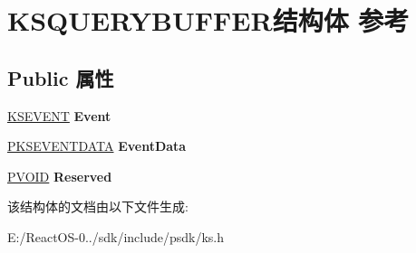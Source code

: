 \hypertarget{struct_k_s_q_u_e_r_y_b_u_f_f_e_r}{}\section{K\+S\+Q\+U\+E\+R\+Y\+B\+U\+F\+F\+E\+R结构体 参考}
\label{struct_k_s_q_u_e_r_y_b_u_f_f_e_r}
\subsection*{Public 属性}
\begin{DoxyCompactItemize}
\item 
\mbox{\label{struct_k_s_q_u_e_r_y_b_u_f_f_e_r_aeb6d2387efdf8c25a071516d506db546}} 
\hyperlink{struct_k_s_i_d_e_n_t_i_f_i_e_r}{K\+S\+E\+V\+E\+NT} {\bfseries Event}
\item 
\mbox{\label{struct_k_s_q_u_e_r_y_b_u_f_f_e_r_a4426803e6409f14dd6c88d8ff118e21d}} 
\hyperlink{struct_k_s_e_v_e_n_t_d_a_t_a}{P\+K\+S\+E\+V\+E\+N\+T\+D\+A\+TA} {\bfseries Event\+Data}
\item 
\mbox{\label{struct_k_s_q_u_e_r_y_b_u_f_f_e_r_aeca8dd5c0ecea824ec6a687d979f6c5f}} 
\hyperlink{interfacevoid}{P\+V\+O\+ID} {\bfseries Reserved}
\end{DoxyCompactItemize}


该结构体的文档由以下文件生成\+:\begin{DoxyCompactItemize}
\item 
E\+:/\+React\+O\+S-\/0../sdk/include/psdk/ks.\+h\end{DoxyCompactItemize}
